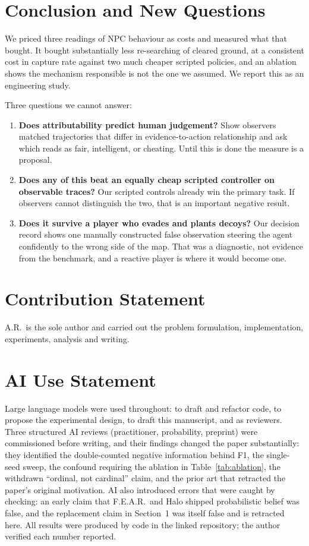 \documentclass{article}
\begin{document}
\section{Conclusion and New Questions}

We priced three readings of NPC behaviour as costs and measured what that bought. It bought
substantially less re-searching of cleared ground, at a consistent cost in capture rate against
two much cheaper scripted policies, and an ablation shows the mechanism responsible is not the
one we assumed. We report this as an engineering study.

Three questions we cannot answer:

\begin{enumerate}
\item \textbf{Does attributability predict human judgement?} Show observers matched
trajectories that differ in evidence-to-action relationship and ask which reads as fair,
intelligent, or cheating. Until this is done the measure is a proposal.
\item \textbf{Does any of this beat an equally cheap scripted controller on observable traces?}
Our scripted controls already win the primary task. If observers cannot distinguish the two,
that is an important negative result.
\item \textbf{Does it survive a player who evades and plants decoys?} Our decision record shows
one manually constructed false observation steering the agent confidently to the wrong side of
the map. That was a diagnostic, not evidence from the benchmark, and a reactive player is where
it would become one.
\end{enumerate}

\section*{Contribution Statement}

A.R.\ is the sole author and carried out the problem formulation, implementation, experiments,
analysis and writing.

\section*{AI Use Statement}

Large language models were used throughout: to draft and refactor code, to propose the
experimental design, to draft this manuscript, and as reviewers. Three structured AI reviews
(practitioner, probability, preprint) were commissioned before writing, and their findings
changed the paper substantially: they identified the double-counted negative information behind
F1, the single-seed sweep, the confound requiring the ablation in Table~\ref{tab:ablation}, the
withdrawn ``ordinal, not cardinal'' claim, and the prior art that retracted the paper's original
motivation. AI also introduced errors that were caught by checking: an early claim that
F.E.A.R.\ and Halo shipped probabilistic belief was false, and the replacement claim in
Section~1 was itself false and is retracted here. All results were produced by code in the
linked repository; the author verified each number reported.



\end{document}

